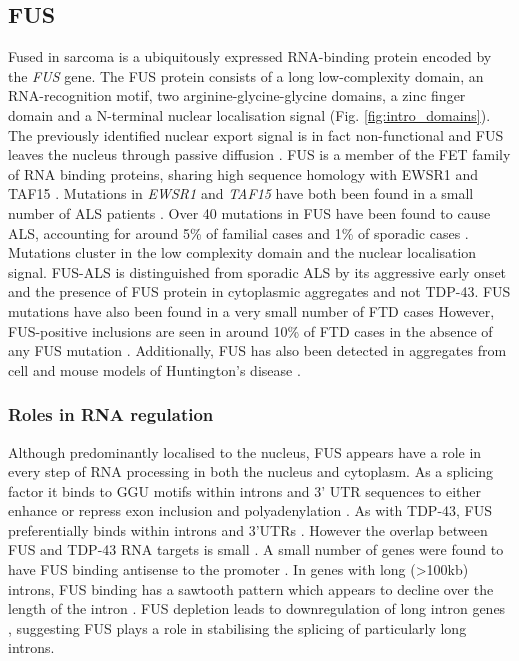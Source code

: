 

\subsection{FUS}

Fused in sarcoma is a ubiquitously expressed RNA-binding protein encoded by the \textit{FUS} gene. 
The FUS protein consists of a long low-complexity domain, an RNA-recognition motif, two arginine-glycine-glycine domains, a zinc finger domain and a N-terminal nuclear localisation signal (Fig. \ref{fig:intro_domains}).
The previously identified nuclear export signal is in fact non-functional and FUS leaves the nucleus through passive diffusion \citep{Ederle2018}. 
FUS is a member of the FET family of RNA binding proteins, sharing high sequence homology with EWSR1 and TAF15 \citep{Kovar2011}.
Mutations in \textit{EWSR1} and \textit{TAF15} have both been found in a small number of ALS patients \citep{Neumann2011, Couthouis2011,Ticozzi2011,Couthouis2012}.
Over 40 mutations in FUS have been found to cause ALS, accounting for around 5\% of familial cases and 1\% of sporadic cases \citep{Vance2009-ye,Kwiatkowski2009}.  
Mutations cluster in the low complexity domain and the nuclear localisation signal.
FUS-ALS is distinguished from sporadic ALS by its aggressive early onset and the presence of FUS protein in cytoplasmic aggregates and not TDP-43. 
FUS mutations have also been found in a very small number of FTD cases \citep{VanLangenhove2010,Broustal2010}
However, FUS-positive inclusions are seen in around 10\% of FTD cases in the absence of any FUS mutation \citep{Neumann2009}. 
Additionally, FUS has also been detected in aggregates from cell and mouse models of Huntington's disease \citep{Doi2008, Kino2016}.

\subsubsection{Roles in RNA regulation}

Although predominantly localised to the nucleus, FUS appears have a role in every step of RNA processing in both the nucleus and cytoplasm. 
As a splicing factor it binds to GGU motifs within introns and 3' UTR sequences to either enhance or repress exon inclusion and polyadenylation \citep{Rogelj2012,Lagier-Tourenne2012-wa}.
As with TDP-43, FUS preferentially binds within introns and 3'UTRs \citep{Lagier-Tourenne2012,Rogelj2012,Ishigaki2012}. 
However the overlap between FUS and TDP-43 RNA targets is small  \citep{Lagier-Tourenne2012-wa,Rogelj2012,Colombrita2012, Honda2014}.
A small number of genes were found to have FUS binding antisense to the promoter \citep{Ishigaki2012}.
In genes with long (>100kb) introns, FUS binding has a sawtooth pattern which appears to decline over the length of the intron \citep{Rogelj2012}. 
FUS depletion leads to downregulation of long intron genes \citep{Lagier-Tourenne2012}, suggesting FUS plays a role in stabilising the splicing of particularly long introns.

